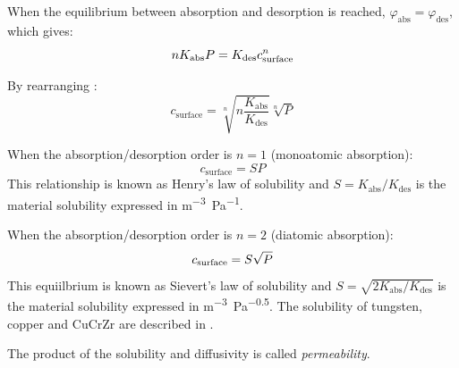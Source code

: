 When the equilibrium between absorption and desorption is reached, $\varphi_\mathrm{abs} = \varphi_\mathrm{des}$, which gives:
\begin{equation}
    n K_\mathrm{abs} P = K_\mathrm{des} c_\mathrm{surface}^n
    \labeq{equilibrium absorption desorption}
\end{equation}

By rearranging :
\begin{equation}
    c_\mathrm{surface} = \sqrt[n]{n \frac{K_\mathrm{abs}}{K_\mathrm{des}}} \sqrt[n]{P}
\end{equation}

When the absorption/desorption order is $n=1$ (monoatomic absorption):
\begin{equation}
    c_\mathrm{surface} = S P
\end{equation}
This relationship is known as Henry's law of solubility and $S = K_\mathrm{abs}/K_\mathrm{des}$ is the material solubility expressed in \si{m^{-3}.Pa^{-1}}.

When the absorption/desorption order is $n=2$ (diatomic absorption):
\begin{equation}
    c_\mathrm{surface} = S \sqrt{P}
    \labeq{sievert's law}
\end{equation}
This equiilbrium is known as Sievert's law of solubility and $S = \sqrt{2 K_\mathrm{abs}/K_\mathrm{des}}$ is the material solubility expressed in \si{m^{-3}.Pa^{-0.5}}.
The solubility of tungsten, copper and CuCrZr are described in .

The product of the solubility and diffusivity is called \textit{permeability}.

